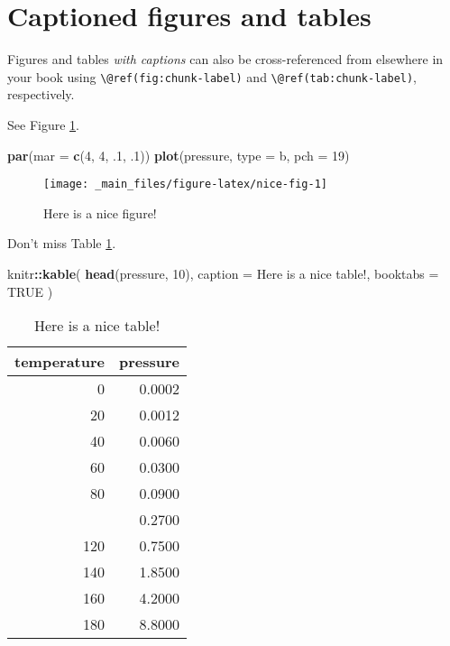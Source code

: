 \documentclass[
]{book}
\newenvironment{Shaded}{\begin{snugshade}}{\end{snugshade}}
\newcommand{\AttributeTok}[1]{\textcolor[rgb]{0.13,0.29,0.53}{#1}}
\newcommand{\ConstantTok}[1]{\textcolor[rgb]{0.56,0.35,0.01}{#1}}
\newcommand{\DecValTok}[1]{\textcolor[rgb]{0.00,0.00,0.81}{#1}}
\newcommand{\FunctionTok}[1]{\textcolor[rgb]{0.13,0.29,0.53}{\textbf{#1}}}
\newcommand{\NormalTok}[1]{#1}
\newcommand{\SpecialCharTok}[1]{\textcolor[rgb]{0.81,0.36,0.00}{\textbf{#1}}}
\newcommand{\StringTok}[1]{\textcolor[rgb]{0.31,0.60,0.02}{#1}}
\theoremstyle{definition}
\theoremstyle{definition}
\theoremstyle{definition}
\theoremstyle{definition}
\theoremstyle{remark}
\begin{document}
\hypertarget{captioned-figures-and-tables}{%
\section{Captioned figures and tables}\label{captioned-figures-and-tables}}

Figures and tables \emph{with captions} can also be cross-referenced from elsewhere in your book using \texttt{\textbackslash{}@ref(fig:chunk-label)} and \texttt{\textbackslash{}@ref(tab:chunk-label)}, respectively.

See Figure \ref{fig:nice-fig}.

\begin{Shaded}
\begin{Highlighting}[]
\FunctionTok{par}\NormalTok{(}\AttributeTok{mar =} \FunctionTok{c}\NormalTok{(}\DecValTok{4}\NormalTok{, }\DecValTok{4}\NormalTok{, .}\DecValTok{1}\NormalTok{, .}\DecValTok{1}\NormalTok{))}
\FunctionTok{plot}\NormalTok{(pressure, }\AttributeTok{type =} \StringTok{\textquotesingle{}b\textquotesingle{}}\NormalTok{, }\AttributeTok{pch =} \DecValTok{19}\NormalTok{)}
\end{Highlighting}
\end{Shaded}

\begin{figure}

{\centering \texttt{[image: \_main\_files/figure-latex/nice-fig-1]} 

}

\caption{Here is a nice figure!}\label{fig:nice-fig}
\end{figure}

Don't miss Table \ref{tab:nice-tab}.

\begin{Shaded}
\begin{Highlighting}[]
\NormalTok{knitr}\SpecialCharTok{::}\FunctionTok{kable}\NormalTok{(}
  \FunctionTok{head}\NormalTok{(pressure, }\DecValTok{10}\NormalTok{), }\AttributeTok{caption =} \StringTok{\textquotesingle{}Here is a nice table!\textquotesingle{}}\NormalTok{,}
  \AttributeTok{booktabs =} \ConstantTok{TRUE}
\NormalTok{)}
\end{Highlighting}
\end{Shaded}

\begin{table}

\caption{\label{tab:nice-tab}Here is a nice table!}
\centering
\begin{tabular}[t]{rr}
\toprule
temperature & pressure\\
\midrule
0 & 0.0002\\
20 & 0.0012\\
40 & 0.0060\\
60 & 0.0300\\
80 & 0.0900\\
\addlinespace
100 & 0.2700\\
120 & 0.7500\\
140 & 1.8500\\
160 & 4.2000\\
180 & 8.8000\\
\bottomrule
\end{tabular}
\end{table}
\end{document}
